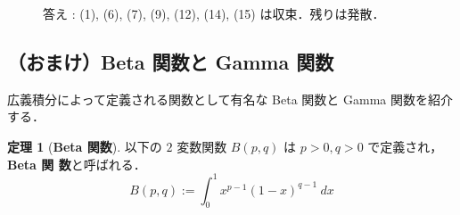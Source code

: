 \documentclass[10pt, uplatex, dvipdfmx]{jsarticle}
\theoremstyle{definition}
\newtheorem{theorem}{定理}[section]
\numberwithin{equation}{section}
\begin{document}
\begin{figure}[b]
  答え : (1), (6), (7), (9), (12), (14), (15) は収束．残りは発散．
\end{figure}

\newpage

\subsection{（おまけ）Beta 関数と Gamma 関数}

広義積分によって定義される関数として有名な Beta 関数と Gamma 関数を紹介
する．
\begin{theorem}[\textbf{Beta 関数}]
  以下の $2$ 変数関数 $B(p,q)$ は $p>0, q>0$ で定義され，\textbf{Beta 関
    数}と呼ばれる．
  \[
    B(p,q) := \int_{0}^{1} x^{p-1} (1-x)^{q-1} \ dx
  \]
\end{theorem}
\end{document}
